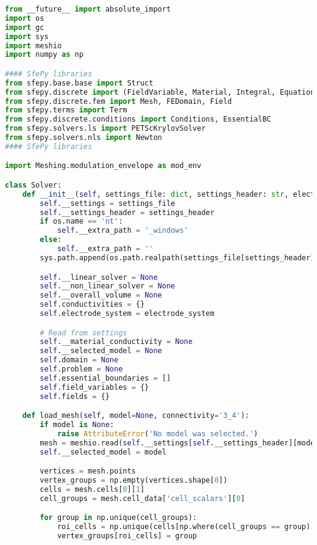\begin{lstlisting}[language=Python,caption={Class interfacing to SfePy and contains routines for the PHM and spherical model \gls{FEM} solution.},captionpos=b,label=lst:fem_solver_class]
from __future__ import absolute_import
import os
import gc
import sys
import meshio
import numpy as np

#### SfePy libraries
from sfepy.base.base import Struct
from sfepy.discrete import (FieldVariable, Material, Integral, Equation, Equations, Problem, Function)
from sfepy.discrete.fem import Mesh, FEDomain, Field
from sfepy.terms import Term
from sfepy.discrete.conditions import Conditions, EssentialBC
from sfepy.solvers.ls import PETScKrylovSolver
from sfepy.solvers.nls import Newton
#### SfePy libraries

import Meshing.modulation_envelope as mod_env

class Solver:
    def __init__(self, settings_file: dict, settings_header: str, electrode_system: str):
        self.__settings = settings_file
        self.__settings_header = settings_header
        if os.name == 'nt':
            self.__extra_path = '_windows'
        else:
            self.__extra_path = ''
        sys.path.append(os.path.realpath(settings_file[settings_header]['lib_path' + self.__extra_path]))

        self.__linear_solver = None
        self.__non_linear_solver = None
        self.__overall_volume = None
        self.conductivities = {}
        self.electrode_system = electrode_system

        # Read from settings
        self.__material_conductivity = None
        self.__selected_model = None
        self.domain = None
        self.problem = None
        self.essential_boundaries = []
        self.field_variables = {}
        self.fields = {}

    def load_mesh(self, model=None, connectivity='3_4'):
        if model is None:
            raise AttributeError('No model was selected.')
        mesh = meshio.read(self.__settings[self.__settings_header][model]['mesh_file' + self.__extra_path])
        self.__selected_model = model

        vertices = mesh.points
        vertex_groups = np.empty(vertices.shape[0])
        cells = mesh.cells[0][1]
        cell_groups = mesh.cell_data['cell_scalars'][0]

        for group in np.unique(cell_groups):
            roi_cells = np.unique(cells[np.where(cell_groups == group)[0]])
            vertex_groups[roi_cells] = group


\end{lstlisting}
